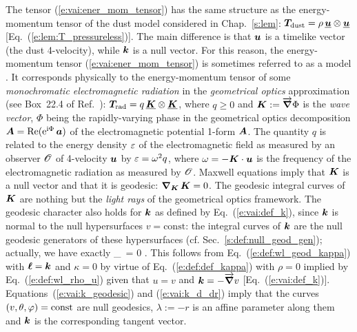The tensor (\ref{e:vai:ener_mom_tensor}) has the same
structure as the energy-momentum tensor of the dust model considered in Chap.~\ref{s:lem}:
$\bm{T}_{\rm dust} = \rho  \, \underline{\bm{u}} \otimes \underline{\bm{u}} $ [Eq.~(\ref{e:lem:T_pressureless})].
The main difference is that $\bm{u}$ is a timelike vector (the dust 4-velocity), while
$\bm{k}$ is a null vector. For this reason, the energy-momentum tensor  (\ref{e:vai:ener_mom_tensor})
is sometimes referred to as a  model \cite{Poiss04}.
It corresponds physically to the energy-momentum tensor of some \emph{monochromatic electromagnetic radiation} in the
\emph{geometrical optics} approximation (see Box~22.4 of Ref.~\cite{MisneTW73}):
$\bm{T}_{\rm rad} = q  \, \underline{\bm{K}} \otimes \underline{\bm{K}}$, where $q\geq 0$ and $\bm{K} := \overrightarrow{\bm{\nabla}}\Phi$ is the \emph{wave vector}, $\Phi$ being the rapidly-varying
phase in the geometrical optics decomposition $\bm{A} = \mathrm{Re}(\mathrm{e}^{\mathrm{i}\Phi} \, \bm{a})$ of the electromagnetic potential 1-form $\bm{A}$. The quantity $q$ is related to the energy density
$\varepsilon$ of the electromagnetic field as measured by an observer $\mathscr{O}$ of 4-velocity $\bm{u}$
by $\varepsilon = \omega^2 q$, where $\omega = - \bm{K}\cdot\bm{u}$ is the frequency of the electromagnetic
radiation as measured by $\mathscr{O}$.
Maxwell equations imply that $\bm{K}$ is a null vector and that it is geodesic:
$\bm{\nabla}_{\bm{K}}\, \bm{K} = 0$. The geodesic integral curves of $\bm{K}$ are nothing but
the \emph{light rays} of the geometrical optics framework.
The geodesic character also holds for $\bm{k}$ as defined by Eq.~(\ref{e:vai:def_k}),
since $\bm{k}$ is normal to the null hypersurfaces $v = \mathrm{const}$:
the integral curves of $\bm{k}$ are the null geodesic generators of these hypersurfaces
(cf. Sec.~\ref{s:def:null_geod_gen}); actually,
we have exactly
\be \label{e:vai:k_geodesic}
    \w{\nabla}_{}\,  = 0 .
\ee
This follows from Eq.~(\ref{e:def:wl_geod_kappa}) with $\bm{\ell} = \bm{k}$ and $\kappa = 0$
by virtue of Eq.~(\ref{e:def:def_kappa}) with $\rho=0$ implied by
Eq.~(\ref{e:def:wl_rho_u}) given that $u = v$ and $\bm{k} =  - \overrightarrow{\bm{\nabla}} v$ [Eq.~(\ref{e:vai:def_k})].
Equations~(\ref{e:vai:k_geodesic}) and (\ref{e:vai:k_d_dr})
imply that the curves $(v,\theta,\varphi) = \mathrm{const}$
are null geodesics, $\lambda:=-r$ is an affine parameter along them and $\bm{k}$ is
the corresponding tangent vector.

